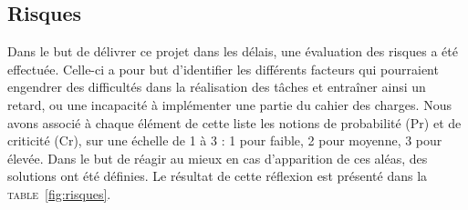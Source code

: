 	\subsection{Risques}
		\label{subsec:risques}



    Dans le but de délivrer ce projet dans les délais, une évaluation des risques a été effectuée. Celle-ci a pour but d'identifier les différents facteurs qui pourraient engendrer des difficultés dans la réalisation des tâches et entraîner ainsi un retard, ou une incapacité à implémenter une partie du cahier des charges. Nous avons associé à chaque élément de cette liste les notions de probabilité (Pr) et de criticité (Cr), sur une échelle de 1 à 3 : 1 pour faible, 2 pour moyenne, 3 pour élevée. Dans le but de réagir au mieux en cas d’apparition de ces aléas, des solutions ont été définies. Le résultat de cette réflexion est présenté dans la \textsc{table}~\ref{fig:risques}. 


